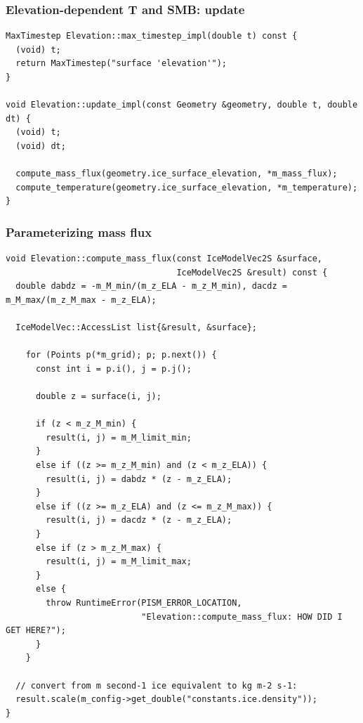 \documentclass[hide notes,intlimits]{beamer}
\begin{document}
\begin{frame}[fragile]
  \frametitle{Elevation-dependent T and SMB: update}
\begin{lstlisting}
MaxTimestep Elevation::max_timestep_impl(double t) const {
  (void) t;
  return MaxTimestep("surface 'elevation'");
}

void Elevation::update_impl(const Geometry &geometry, double t, double dt) {
  (void) t;
  (void) dt;

  compute_mass_flux(geometry.ice_surface_elevation, *m_mass_flux);
  compute_temperature(geometry.ice_surface_elevation, *m_temperature);
}
\end{lstlisting}
\end{frame}

\begin{frame}[fragile]
  \frametitle{Parameterizing mass flux}
\begin{lstlisting}
void Elevation::compute_mass_flux(const IceModelVec2S &surface,
                                  IceModelVec2S &result) const {
  double dabdz = -m_M_min/(m_z_ELA - m_z_M_min), dacdz = m_M_max/(m_z_M_max - m_z_ELA);

  IceModelVec::AccessList list{&result, &surface};

    for (Points p(*m_grid); p; p.next()) {
      const int i = p.i(), j = p.j();

      double z = surface(i, j);

      if (z < m_z_M_min) {
        result(i, j) = m_M_limit_min;
      }
      else if ((z >= m_z_M_min) and (z < m_z_ELA)) {
        result(i, j) = dabdz * (z - m_z_ELA);
      }
      else if ((z >= m_z_ELA) and (z <= m_z_M_max)) {
        result(i, j) = dacdz * (z - m_z_ELA);
      }
      else if (z > m_z_M_max) {
        result(i, j) = m_M_limit_max;
      }
      else {
        throw RuntimeError(PISM_ERROR_LOCATION,
                           "Elevation::compute_mass_flux: HOW DID I GET HERE?");
      }
    }

  // convert from m second-1 ice equivalent to kg m-2 s-1:
  result.scale(m_config->get_double("constants.ice.density"));
}
\end{lstlisting}
\end{frame}
\end{document}
